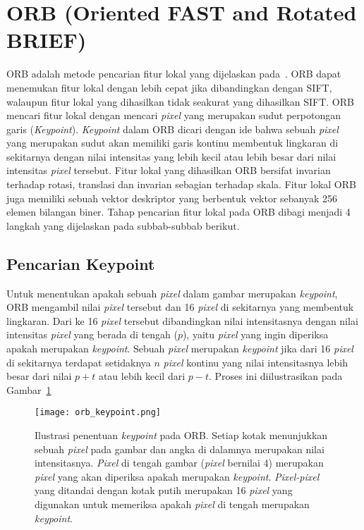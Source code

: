 \section{ORB (Oriented FAST and Rotated BRIEF)}
\label{sec:orb}
ORB adalah metode pencarian fitur lokal yang dijelaskan pada~\cite{rublee2011orb}. ORB dapat menemukan fitur lokal dengan lebih cepat jika dibandingkan dengan SIFT, walaupun fitur lokal yang dihasilkan tidak seakurat yang dihasilkan SIFT. ORB mencari fitur lokal dengan mencari \textit{pixel} yang merupakan sudut perpotongan garis (\textit{Keypoint}). \textit{Keypoint} dalam ORB dicari dengan ide bahwa sebuah \textit{pixel} yang merupakan sudut akan memiliki garis kontinu membentuk lingkaran di sekitarnya dengan nilai intensitas yang lebih kecil atau lebih besar dari nilai intensitas \textit{pixel} tersebut. Fitur lokal yang dihasilkan ORB bersifat invarian terhadap rotasi, translasi dan invarian sebagian terhadap skala. Fitur lokal ORB juga memiliki sebuah vektor deskriptor yang berbentuk vektor sebanyak 256 elemen bilangan biner. Tahap pencarian fitur lokal pada ORB dibagi menjadi 4 langkah yang dijelaskan pada subbab-subbab berikut.

\subsection{Pencarian Keypoint}
\label{subsec:orb_keypoint}
Untuk menentukan apakah sebuah \textit{pixel} dalam gambar merupakan \textit{keypoint}, ORB mengambil nilai \textit{pixel} tersebut dan 16 \textit{pixel} di sekitarnya yang membentuk lingkaran. Dari ke 16 \textit{pixel} tersebut dibandingkan nilai intensitasnya dengan nilai intensitas \textit{pixel} yang berada di tengah ($p$), yaitu \textit{pixel} yang ingin diperiksa apakah merupakan \textit{keypoint}. Sebuah \textit{pixel} merupakan \textit{keypoint} jika dari 16 \textit{pixel} di sekitarnya terdapat setidaknya $n$ \textit{pixel} kontinu yang nilai intensitasnya lebih besar dari nilai $p + t$ atau lebih kecil dari $p - t$. Proses ini diilustrasikan pada Gambar~\ref{fig:orb_keypoint}

\begin{figure}[H]
	\centering
	\texttt{[image: orb\_keypoint.png]}
	\caption{Ilustrasi penentuan \textit{keypoint} pada ORB. Setiap kotak menunjukkan sebuah \textit{pixel} pada gambar dan angka di dalamnya merupakan nilai intensitasnya. \textit{Pixel} di tengah gambar (\textit{pixel} bernilai 4) merupakan \textit{pixel} yang akan diperiksa apakah merupakan \textit{keypoint}. \textit{Pixel-pixel} yang ditandai dengan kotak putih merupakan 16 \textit{pixel} yang digunakan untuk memeriksa apakah \textit{pixel} di tengah merupakan \textit{keypoint}.}
	\label{fig:orb_keypoint}	
\end{figure}

